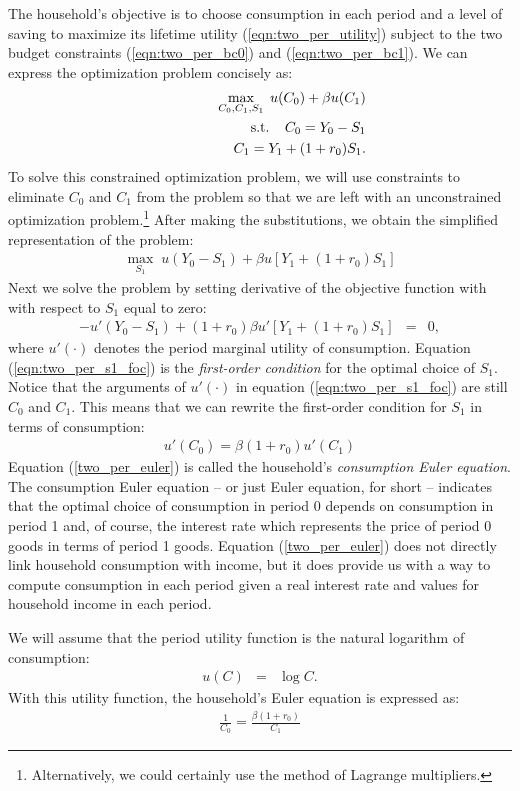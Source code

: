 \documentclass[12pt,fleqn]{article}
\newcommand{\EE}{\begin{eqnarray}}
\newcommand{\FF}{\end{eqnarray}}
\newcommand{\tn}{\textnormal}
\begin{document}
\begin{appendix}
The household's objective is to choose consumption in each period and a level of saving to maximize its lifetime utility (\ref{eqn:two_per_utility}) subject to the two budget constraints (\ref{eqn:two_per_bc0}) and (\ref{eqn:two_per_bc1}). We can express the optimization problem concisely as:
	\EE
	&&\max_{C_0,C_1,S_1} \; u(C_0) + \beta u(C_1)\\
	&& \; \; \; \;  \; \; \; \; \tn{s.t.} \; \; \; \; C_0 = Y_0 - S_1\\
	&&\; \; \; \; \; \; \; \; \; \; \; \; \; \; \; \; \; C_1 = Y_1 + (1+r_0)S_1.
	\FF
To solve this constrained optimization problem, we will use constraints to eliminate $C_0$ and $C_1$ from the problem so that we are left with an unconstrained optimization problem.\footnote{Alternatively, we could certainly use the method of Lagrange multipliers.} After making the substitutions, we obtain the simplified representation of the problem:
	\EE
	\max_{S_1} \; u( Y_0 - S_1) + \beta u\left[ Y_1 + (1+r_0)S_1\right]
	\FF
Next we solve the problem by setting derivative of the objective function with with respect to $S_1$ equal to zero:
	\EE
	-u'( Y_0 - S_1) + (1+r_0) \beta u'\left[ Y_1 + (1+r_0)S_1\right] & = & 0 \label{eqn:two_per_s1_foc},
	\FF
where $u'(\cdot)$ denotes the period marginal utility of consumption. Equation (\ref{eqn:two_per_s1_foc}) is the \emph{first-order condition} for the optimal choice of $S_1$. Notice that the arguments of $u'(\cdot)$ in equation (\ref{eqn:two_per_s1_foc}) are still $C_0$ and $C_1$. This means that we can rewrite the first-order condition for $S_1$ in terms of consumption:
	\EE
	\boxed{u'(C_0) = \beta (1+ r_0) u'(C_1)} \label{two_per_euler}
	\FF
Equation (\ref{two_per_euler}) is called the household's \emph{consumption Euler equation}. The consumption Euler equation -- or just Euler equation, for short -- indicates that the optimal choice of consumption in period 0 depends on consumption in period 1 and, of course, the interest rate which represents the price of period 0 goods in terms of period 1 goods. Equation (\ref{two_per_euler}) does not directly link household consumption with income, but it does provide us with a way to compute consumption in each period given a real interest rate and values for household income in each period.

We will assume that the period utility function is the natural logarithm of consumption:
	\EE
	u(C) & = & \log C.
	\FF
With this utility function, the household's Euler equation is expressed as:
	\EE
	\boxed{\frac{1}{C_0} = \frac{\beta (1+ r_0)}{C_1}} \label{two_per_euler}
	\FF



\end{appendix}
\end{document}

